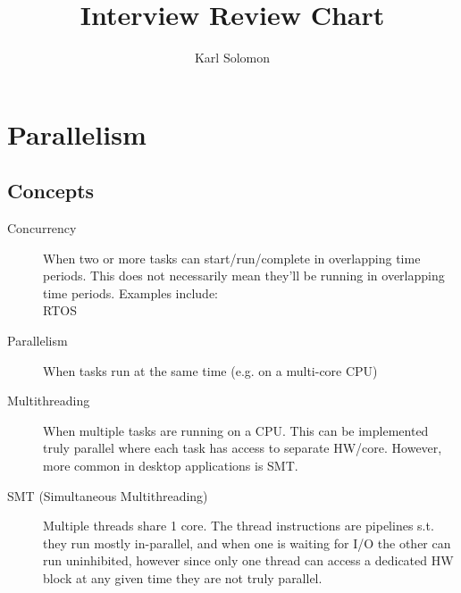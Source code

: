 \documentclass{article}
\begin{document}
\selectfont
\title{Interview Review Chart}
\author{Karl Solomon}
\maketitle
\section{Parallelism}
    \subsection{Concepts}
      \begin{description}
        \item[Concurrency]
          When two or more tasks can start/run/complete in overlapping time periods. This does not necessarily mean they'll be running in overlapping time periods. Examples include: \\ RTOS
      \end{description}
      \begin{description}
        \item[Parallelism]
          When tasks run at the same time (e.g. on a multi-core CPU)
      \end{description}
      \begin{description}
        \item[Multithreading]
          When multiple tasks are running on a CPU. This can be implemented truly parallel where each task has access to separate HW/core. However, more common in desktop applications is SMT.
      \end{description}
      \begin{description}
        \item[SMT (Simultaneous Multithreading)]
          Multiple threads share 1 core. The thread instructions are pipelines s.t. they run mostly in-parallel, and when one is waiting for I/O the other can run uninhibited, however since only one thread can access a dedicated HW block at any given time they are not truly parallel.
      \end{description}
\end{document}
